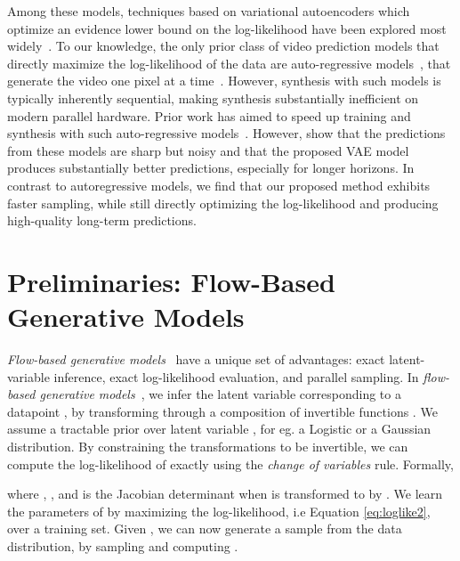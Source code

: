 \documentclass{article} \usepackage{iclr2020_conference,times}
\begin{document}
Among these models, techniques based on variational autoencoders which optimize an evidence lower bound on the log-likelihood have been explored most widely~\citep{babaeizadeh2017stochastic,denton2018stochastic,lee2018stochastic,xue2016visual,li2018flow}. To our knowledge, the only prior class of video prediction models that directly maximize the log-likelihood of the data are auto-regressive models~\citep{hochreiter1997long,graves2013generating,pixelrnn,oord2016conditional,van2016wavenet}, that generate the video one pixel at a time~\citep{kalchbrenner2016video}. However, synthesis with such models is typically inherently sequential, making synthesis substantially inefficient on modern parallel hardware. Prior work has aimed to speed up training and synthesis with such auto-regressive models~\citep{reed2017parallel,ramachandran2017fast}. However, \citep{babaeizadeh2017stochastic} show
that the predictions from these models are sharp but noisy
and that the proposed VAE model produces substantially
better predictions, especially for longer horizons. In contrast to autoregressive models, we find that our proposed method exhibits faster sampling, while still directly optimizing the log-likelihood and producing high-quality long-term predictions.

\section{Preliminaries: Flow-Based Generative Models}
\label{sec:prelim}



\emph{Flow-based generative models}~\citep{dinh2014nice,dinh2016density} have a unique set of advantages: exact latent-variable inference, exact log-likelihood evaluation, and parallel sampling. In \emph{flow-based generative models}~\citep{dinh2014nice,dinh2016density}, we infer the latent variable  corresponding to a datapoint , by transforming  through a composition of invertible functions . We assume a tractable prior  over latent variable , for eg. a Logistic or a Gaussian distribution. By constraining the transformations to be invertible, we can compute the log-likelihood of  exactly using the \emph{change of variables} rule. Formally,



where , ,  and  is the Jacobian determinant when  is transformed to  by . We learn the parameters of  by maximizing the log-likelihood, i.e Equation \eqref{eq:loglike2}, over a training set. Given , we can now generate a sample  from the data distribution, by sampling  and 
computing .
\end{document}
